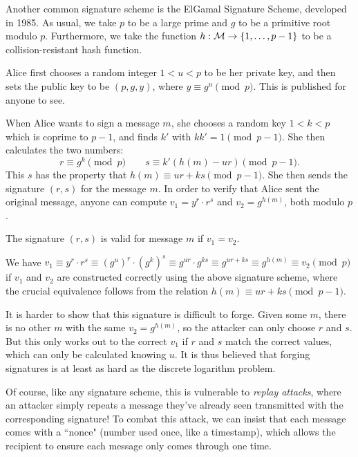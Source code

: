 \documentclass{article}
\begin{document}
Another common signature scheme is the ElGamal Signature Scheme, developed in 1985. As usual, we take $p$ to be a large prime and $g$ to be a primitive root modulo $p$. Furthermore, we take the function $h : \mathcal{M} \to \left\lbrace 1, \dots, p-1 \right\rbrace$ to be a collision-resistant hash function.

Alice first chooses a random integer $1 < u < p$ to be her private key, and then sets the public key to be $(p, g, y)$, where $y \equiv g^u \pmod p$. This is published for anyone to see.

When Alice wants to sign a message $m$, she chooses a random key $1 < k < p$ which is coprime to $p-1$, and finds $k'$ with $kk' = 1 \pmod{p-1}$. She then calculates the two numbers:
\[
r \equiv g^k \pmod p
\qquad
s \equiv k'(h(m) - ur) \pmod{p-1}.
\]
This $s$ has the property that $h(m) \equiv ur + ks \pmod{p-1}$. She then sends the signature $(r, s)$ for the message $m$. In order to verify that Alice sent the original message, anyone can compute $v_1 = y^r \cdot r^s$ and $v_2 = g^{h(m)}$, both modulo $p$.

\begin{proposition}
    The signature $(r, s)$ is valid for message $m$ if $v_1 = v_2$.
\end{proposition}

\begin{prf}
    We have $v_1 \equiv y^r \cdot r^s \equiv (g^u)^r \cdot (g^k)^s \equiv g^{ur} \cdot g^{ks} \equiv g^{ur + ks} \equiv g^{h(m)} \equiv v_2 \pmod p$ if $v_1$ and $v_2$ are constructed correctly using the above signature scheme, where the crucial equivalence follows from the relation $h(m) \equiv ur + ks \pmod{p-1}$.
\end{prf}

\begin{note}
	It is harder to show that this signature is difficult to forge. Given some $m$, there is no other $m$ with the same $v_2 = g^{h(m)}$, so the attacker can only choose $r$ and $s$. But this only works out to the correct $v_1$ if $r$ and $s$ match the correct values, which can only be calculated knowing $u$. It is thus believed that forging signatures is at least as hard as the discrete logarithm problem.
\end{note}

\begin{note}
	Of course, like any signature scheme, this is vulnerable to \textit{replay attacks}, where an attacker simply repeats a message they've already seen transmitted with the corresponding signature! To combat this attack, we can insist that each message comes with a ``nonce" (number used once, like a timestamp), which allows the recipient to ensure each message only comes through one time.
\end{note}
\end{document}
